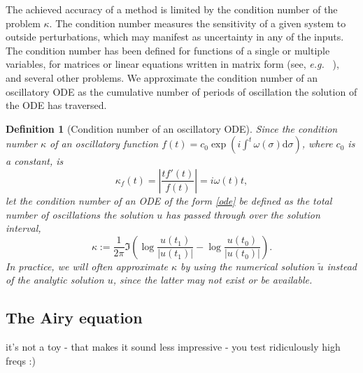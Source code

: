 \documentclass[10pt]{article}
\newcommand{\eg}{{\it e.g.\ }}
\newtheorem{defn}[thm]{Definition}
\newcommand{\om}{\omega}
\newcommand{\AB}[1]{{\color{orange}#1}}
\begin{document}
The achieved accuracy of a method is limited by the condition number of the
problem $\kappa$. The condition number measures the sensitivity of a given system to
outside perturbations, which may manifest as uncertainty in any of the inputs.
The condition number has been defined for functions of a single or multiple
variables, for matrices or linear equations written in matrix form (see, \eg
\cite{rice1966,trefethenlinalg}), and several other problems. We approximate
the condition number of an oscillatory ODE as the cumulative number of periods of
oscillation the solution of the ODE has traversed.
\begin{defn}[Condition number of an oscillatory ODE]\label{conditionnodef}
    Since the condition number $\kappa$ of an oscillatory function $f(t) =
    c_0\exp(i\int^t \om(\sigma)\mathrm{d}\sigma)$, where $c_0$ is a constant,
    is
    \begin{equation}\label{conditionno}
        \kappa_f(t) = \left| \frac{tf'(t)}{f(t)} \right| = i\om(t)t,
    \end{equation}
    let the condition number of an ODE of the form \cref{ode} be defined as the total number of oscillations the solution $u$ has passed through over the solution interval, 
    \begin{equation}
        \kappa := \frac{1}{2\pi}\Im\left(\log\frac{u(t_1)}{|u(t_1)|}  - \log\frac{u(t_0)}{|u(t_0)|}\right).
    \end{equation}
    In practice, we will often approximate $\kappa$ by using the numerical
    solution $\tilde{u}$ instead of the analytic solution $u$, since the latter may not
    exist or be available.
\end{defn}


\subsection{The Airy equation}
\AB{it's not a toy - that makes it sound less impressive - you test ridiculously high freqs :)}
\end{document}
